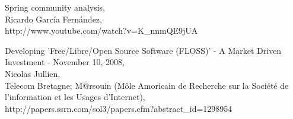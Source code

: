 \documentclass[11pt]{scrartcl}
\begin{document}
\begin{thebibliography}{9}

  Spring community analysis,\\
  Ricardo Garc\'ia Fern\'andez,\\
  http://www.youtube.com/watch?v=K\_nnmQE9jUA

\bibitem{}
    Developing 'Free/Libre/Open Source Software (FLOSS)' - A Market Driven Investment - November 10, 2008,\\
    Nicolas Jullien,\\
    Telecom Bretagne; M@rsouin (M\^ole Amoricain de Recherche sur la Soci\'et\'e de l'information et les Usages d'Internet),\\
    http://papers.ssrn.com/sol3/papers.cfm?abstract\_id=1298954

\end{thebibliography}
\end{document}
